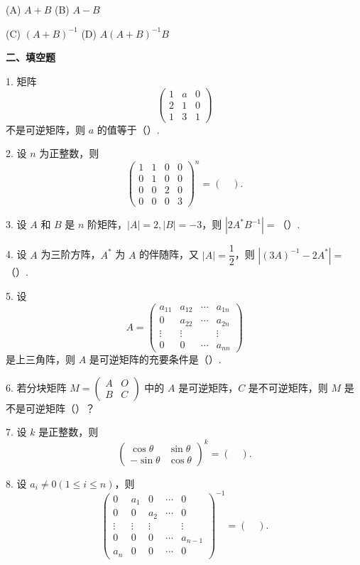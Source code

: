 \documentclass[UTF8,12pt,a4paper,fontset=fandol]{ctexart}
\begin{document}
(A) $A+B$\qquad
(B) $A-B$

(C) $(A+B)^{-1}$\qquad
(D) $A(A+B)^{-1}B$

\noindent\textbf{二、填空题}

1. 矩阵
\[
\left(
\begin{array}{ccc}
1 & a & 0\\
2 & 1 & 0\\
1 & 3 & 1
\end{array}
\right)
\]
不是可逆矩阵，则 $a$ 的值等于（\quad ）.

2. 设 $n$ 为正整数，则
\[
\left(
\begin{array}{cccc}
1 & 1 & 0 & 0\\
0 & 1 & 0 & 0\\
0 & 0 & 2 & 0\\
0 & 0 & 0 & 3
\end{array}
\right)^n
=\left(\quad\right).
\]

3. 设 $A$ 和 $B$ 是 $n$ 阶矩阵，$|A|=2, |B|=-3$，则 $|2A^*B^{-1}|=$（\quad ）.

4. 设 $A$ 为三阶方阵，$A^*$ 为 $A$ 的伴随阵，又 $|A|=\dfrac12$，则 $|(3A)^{-1}-2A^*|=$（\quad ）.

5. 设
\[
A=
\left(
\begin{array}{cccc}
a_{11} & a_{12} & \cdots & a_{1n}\\
0 & a_{22} & \cdots & a_{2n}\\
\vdots & \vdots & & \vdots\\
0 & 0 & \cdots & a_{nn}
\end{array}
\right)
\]
是上三角阵，则 $A$ 是可逆矩阵的充要条件是（\quad ）.

6. 若分块矩阵 $M=
\left(
\begin{array}{cc}
A & O\\
B & C
\end{array}
\right)$ 中的 $A$ 是可逆矩阵，$C$ 是不可逆矩阵，则 $M$ 是不是可逆矩阵（\quad ）？

7. 设 $k$ 是正整数，则
\[
\left(
\begin{array}{cc}
\cos\theta & \sin\theta\\
-\sin\theta & \cos\theta
\end{array}
\right)^k
=\left(\quad\right).
\]

8. 设 $a_i\ne0(1\le i\le n)$，则
\[
\left(
\begin{array}{ccccc}
0 & a_1 & 0 & \cdots & 0\\
0 & 0 & a_2 & \cdots & 0\\
\vdots & \vdots & \vdots & & \vdots\\
0 & 0 & 0 & \cdots & a_{n-1}\\
a_n & 0 & 0 & \cdots & 0
\end{array}
\right)^{-1}
=\left(\quad\right).
\]
\end{document}
